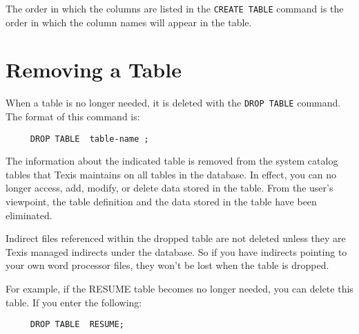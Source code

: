 \begin{description}
%

The order in which the columns are listed in the {\tt CREATE TABLE} command
is the order in which the column names will appear in the table.
\end{description}

\section{Removing a Table}

When a table is no longer needed, it is deleted with the {\tt DROP TABLE}
command.  The format of this command is:
\begin{verbatim}
     DROP TABLE  table-name ;
\end{verbatim}

The information about the indicated table is removed from the system
catalog tables that Texis maintains on all tables in the database.  In
effect, you can no longer access, add, modify, or delete data stored
in the table.  From the user's viewpoint, the table definition and the
data stored in the table have been eliminated.

Indirect files referenced within the dropped table are not deleted
unless they are Texis managed indirects under the database. So if
you have indirects pointing to your own word processor files, they
won't be lost when the table is dropped.

For example, if the RESUME table becomes no longer needed, you can
delete this table.  If you enter the following:
\begin{verbatim}
     DROP TABLE  RESUME;
\end{verbatim}

